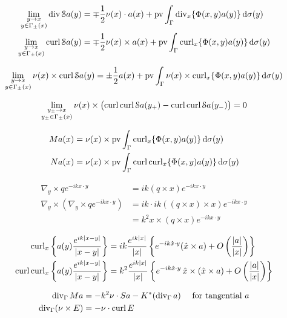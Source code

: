 \begin{align*}
  \lim_{\substack{y\to x\\y\in\Gamma_{\pm}(x)}}\operatorname{div} \mathcal{S}a(y) &= 
  \mp\frac{1}{2}\nu(x)\cdot a(x)+\operatorname{pv}\int_{\Gamma}\operatorname{div}_x\{\Phi(x,y)a(y)\}\,\text{d}\sigma(y)\\
  \lim_{\substack{y\to x\\y\in\Gamma_{\pm}(x)}}\operatorname{curl} \mathcal{S}a(y) &= 
  \mp\frac{1}{2}\nu(x)\times a(x)+\operatorname{pv}\int_{\Gamma}\operatorname{curl}_x\{\Phi(x,y)a(y)\}\,\text{d}\sigma(y)
\end{align*}

\begin{align*}
  \lim_{\substack{y\to x\\y\in\Gamma_{\pm}(x)}}\nu(x)\times\operatorname{curl}\mathcal{S}
  a(y) =\pm\frac{1}{2}a(x)+\operatorname{pv}\int_{\Gamma}\nu(x)\times\operatorname{curl}_x\{\Phi(x,y)a(y)\}\,\text{d}\sigma(y)
\end{align*}

\begin{align*}
  \lim_{\substack{y_{\pm}\to x\\y_{\pm}\in\Gamma_{\pm}(x)}}\nu(x)\times
  \bigl(\operatorname{curl}\operatorname{curl}\mathcal{S}a(y_+)-\operatorname{curl}\operatorname{curl}\mathcal{S}a(y_-)\bigr)=0 
\end{align*}

\begin{align*}
  Ma(x) &= \nu(x)\times\operatorname{pv}\int_{\Gamma}\operatorname{curl}_x\{\Phi(x,y)a(y)\}\,\text{d}\sigma(y)\\
  Na(x) &= \nu(x)\times\operatorname{pv}\int_{\Gamma}\operatorname{curl}\operatorname{curl}_x\{\Phi(x,y)a(y)\}\,\text{d}\sigma(y)
\end{align*}

\begin{align*}
  \nabla_y\times qe^{-ikx\cdot y} &= ik(q\times x)e^{-ikx\cdot y} \\
  \nabla_y\times(\nabla_y\times qe^{-ikx\cdot y}) &= ik\cdot ik ((q\times x)\times x)e^{-ikx\cdot y} \\
  &= k^2 x\times(q\times x)e^{-ikx\cdot y}
\end{align*}

\begin{align*}
  \operatorname{curl}_x \left\{a(y)\frac{e^{ik|x-y|}}{|x-y|}\right\} &= ik\frac{e^{ik|x|}}{|x|}\left\{e^{-ik\hat{x}\cdot y}(\hat{x}\times a) + O\left(\frac{|a|}{|x|}\right)\right\} \\
  \operatorname{curl}\operatorname{curl}_x \left\{a(y)\frac{e^{ik|x-y|}}{|x-y|}\right\} &= k^2\frac{e^{ik|x|}}{|x|}\left\{e^{-ik\hat{x}\cdot y}\,\hat{x}\times(\hat{x}\times a) + O\left(\frac{|a|}{|x|}\right)\right\} 
\end{align*}

\begin{align*}
  \operatorname{div}_\Gamma{Ma} &= -k^2\nu\cdot Sa-K^*(\operatorname{div}_\Gamma a)\quad\text{ for tangential $a$} \\
  \operatorname{div}_\Gamma(\nu\times E) &= -\nu\cdot\operatorname{curl} E
\end{align*}

